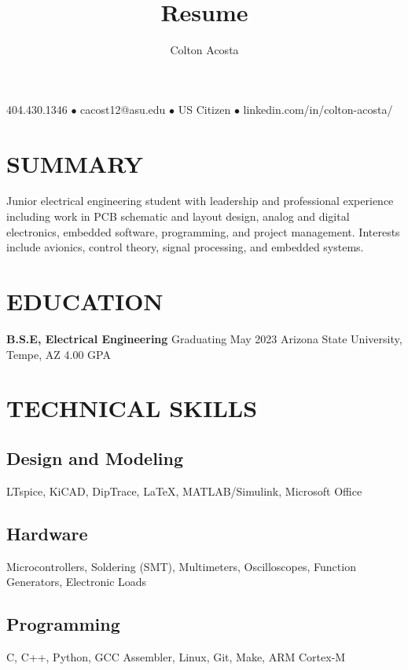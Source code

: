 \documentclass{article}
\makeatletter
\renewcommand{\maketitle}{
	\begin{center}
		{\huge\bfseries
			\theauthor}
			
		404.430.1346 $\bullet$ cacost12@asu.edu $\bullet$ US Citizen $\bullet$ linkedin.com/in/colton-acosta/
	\end{center}
}
\makeatother
\begin{document}
\title{Resume}
\author{Colton Acosta}
\maketitle
\section{SUMMARY}
Junior electrical engineering student with leadership and professional experience including work in PCB schematic and layout design, analog and digital electronics, embedded software, programming, and project management. Interests include avionics, control theory, signal processing, and embedded systems. 
\section{EDUCATION}
\textbf{B.S.E, Electrical Engineering}
\hfill 
Graduating May 2023
\linebreak
Arizona State University, Tempe, AZ 
\hfill
4.00 GPA

\section{TECHNICAL SKILLS}
\subsection{Design and Modeling}
LTspice, KiCAD, DipTrace, \LaTeX, MATLAB/Simulink, Microsoft Office
\subsection{Hardware}
Microcontrollers, Soldering (SMT), Multimeters, Oscilloscopes, Function Generators, Electronic Loads
\subsection{Programming} 
C, C++, Python, GCC Assembler, Linux, Git, Make, ARM Cortex-M 
\end{document}
